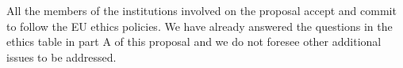 All the members of the institutions involved on the \acronym proposal accept and commit to follow the EU ethics policies.
We have already answered the questions in the ethics table in part A of this proposal and we do not foresee other additional issues to be addressed. 

%
